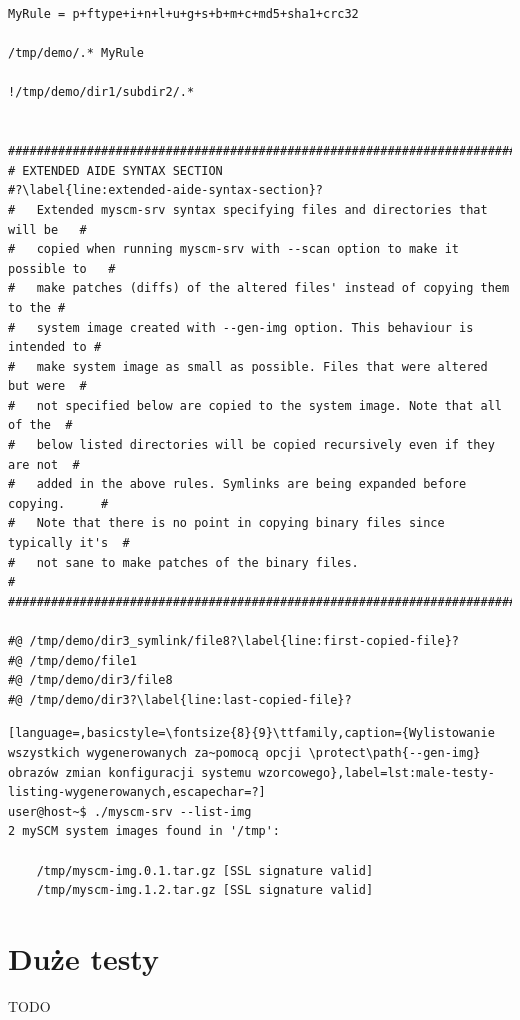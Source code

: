 \documentclass[thesis]{subfiles}
\begin{document}
\begin{lstlisting}
MyRule = p+ftype+i+n+l+u+g+s+b+m+c+md5+sha1+crc32

/tmp/demo/.* MyRule

!/tmp/demo/dir1/subdir2/.*


###############################################################################
# EXTENDED AIDE SYNTAX SECTION                                                #?\label{line:extended-aide-syntax-section}?
#   Extended myscm-srv syntax specifying files and directories that will be   #
#   copied when running myscm-srv with --scan option to make it possible to   #
#   make patches (diffs) of the altered files' instead of copying them to the #
#   system image created with --gen-img option. This behaviour is intended to #
#   make system image as small as possible. Files that were altered but were  #
#   not specified below are copied to the system image. Note that all of the  #
#   below listed directories will be copied recursively even if they are not  #
#   added in the above rules. Symlinks are being expanded before copying.     #
#   Note that there is no point in copying binary files since typically it's  #
#   not sane to make patches of the binary files.                             #
###############################################################################

#@ /tmp/demo/dir3_symlink/file8?\label{line:first-copied-file}?
#@ /tmp/demo/file1
#@ /tmp/demo/dir3/file8
#@ /tmp/demo/dir3?\label{line:last-copied-file}?
\end{lstlisting}
\label{male-testy-plik-konfiguracyjny-last-page} %

\begin{minipage}{\linewidth}
\begin{lstlisting}[language=,basicstyle=\fontsize{8}{9}\ttfamily,caption={Wylistowanie wszystkich wygenerowanych za~pomocą opcji \protect\path{--gen-img} obrazów zmian konfiguracji systemu wzorcowego},label=lst:male-testy-listing-wygenerowanych,escapechar=?]
user@host~$ ./myscm-srv --list-img
2 mySCM system images found in '/tmp':

    /tmp/myscm-img.0.1.tar.gz [SSL signature valid]
    /tmp/myscm-img.1.2.tar.gz [SSL signature valid]
\end{lstlisting}
\end{minipage}


\section{Duże testy}
\label{sec:duze-testy}

TODO
\end{document}
